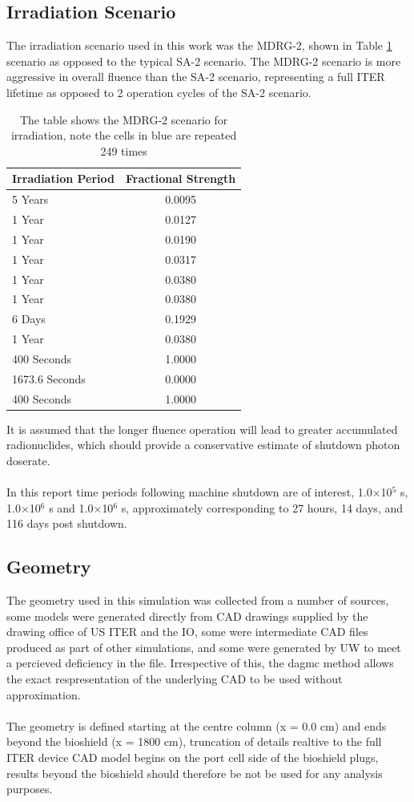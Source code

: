 \documentclass[12pt]{article}
\begin{document}
\subsection{Irradiation Scenario}
The irradiation scenario used in this work was the MDRG-2, shown in Table
\ref{tab:irrad_scenario} scenario as opposed to the typical SA-2 scenario.
The MDRG-2 scenario is more aggressive in overall fluence than the SA-2
scenario, representing a full ITER lifetime as opposed to 2 operation
cycles of the SA-2 scenario.
\begin{table}[ht!]
   \begin{tabular}{| l | c |}
      \hline 
      Irradiation Period & Fractional Strength \\
      \hline
      5 Years & 0.0095 \\
      1 Year  & 0.0127 \\
      1 Year  & 0.0190 \\
      1 Year  & 0.0317 \\
      1 Year  & 0.0380 \\
      1 Year  & 0.0380 \\
      6 Days  & 0.1929 \\
      1 Year  & 0.0380 \\
      \cellcolor{blue!25} 400 Seconds & 1.0000 \\
      \cellcolor{blue!25}1673.6 Seconds & 0.0000 \\
      400 Seconds & 1.0000 \\
      \hline
\end{tabular}
\caption{The table shows the MDRG-2 scenario for irradiation, note the
         cells in \textcolor{blue!25}{blue} are repeated 249 times}
\label{tab:irrad_scenario}
\end{table}
It is assumed that the longer fluence operation will lead to greater accumulated
radionuclides, which should provide a conservative estimate of shutdown photon
doserate.
\\
\\
In this report time periods following machine shutdown are of interest,
1.0$\times$10$^5$ s, 1.0$\times$10$^6$ s and 1.0$\times$10$^6$ s, approximately
corresponding to 27 hours, 14 days, and 116 days post shutdown.
\subsection{Geometry}
The geometry used in this simulation was collected from a number of sources,
some models were generated directly from CAD drawings supplied by the
drawing office of US ITER and the IO, some were intermediate CAD files produced
as part of other simulations, and some were generated by UW to meet a percieved
deficiency in the file. Irrespective of this, the \gls{dagmc} method allows the
exact respresentation of the underlying CAD to be used without approximation.
\\
\\
The geometry is defined starting at the centre column (x = 0.0 cm) and ends
beyond the bioshield (x = 1800 cm), truncation of details realtive to the full
ITER device CAD model begins on the port cell side of the bioshield plugs,
results beyond the bioshield should therefore be not be used for any
analysis purposes. 
\end{document}
